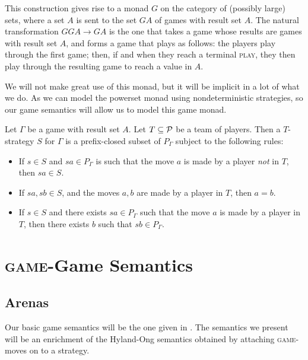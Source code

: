 \documentclass{article}
\newcommand{\game}{\textsc{game}}
\newcommand{\play}{\textsc{play}}
\begin{document}
\begin{remark}
  This construction gives rise to a monad $G$ on the category of (possibly large) sets, where a set $A$ is sent to the set $GA$ of games with result set $A$.  
  The natural transformation $GGA\to GA$ is the one that takes a game whose results are games with result set $A$, and forms a game that plays as follows: the players play through the first game; then, if and when they reach a terminal \play{}, they then play through the resulting game to reach a value in $A$.

  We will not make great use of this monad, but it will be implicit in a lot of what we do.  
  As we can model the powerset monad using nondeterministic strategies, so our game semantics will allow us to model this game monad.
\end{remark}

\begin{definition}
  Let $\Gamma$ be a game with result set $A$.  
  Let $T\subset \P$ be a team of players.  
  Then a $T$-strategy $S$ for $\Gamma$ is a prefix-closed subset of $P_\Gamma$ subject to the following rules:
  \begin{itemize}
    \item If $s\in S$ and $sa\in P_\Gamma$ is such that the move $a$ is made by a player \emph{not} in $T$, then $sa\in S$.
    \item If $sa,sb\in S$, and the moves $a,b$ are made by a player in $T$, then $a=b$.
    \item If $s\in S$ and there exists $sa\in P_\Gamma$ such that the move $a$ is made by a player in $T$, then there exists $b$ such that $sb\in P_\Gamma$.
  \end{itemize}
\end{definition}

\section{\game{}-Game Semantics}

\subsection{Arenas}

Our basic game semantics will be the one given in \cite{hoPcf}.  
The semantics we present will be an enrichment of the Hyland-Ong semantics obtained by attaching \game{}-moves on to a strategy.  
\end{document}
